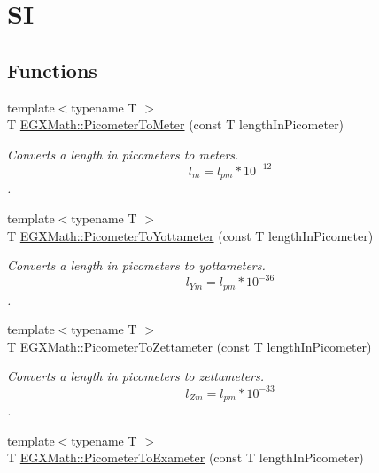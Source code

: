 \hypertarget{group___e_g_x_math-_conversions-_length_conversions-_s_i-_picometer-_s_i}{}\section{SI}
\label{group___e_g_x_math-_conversions-_length_conversions-_s_i-_picometer-_s_i}
\subsection*{Functions}
\begin{DoxyCompactItemize}
\item 
{\footnotesize template$<$typename T $>$ }\\T \mbox{\hyperlink{group___e_g_x_math-_conversions-_length_conversions-_s_i-_picometer-_s_i_gab975f2eb902fcbb745ee4edbbf611f69}{E\+G\+X\+Math\+::\+Picometer\+To\+Meter}} (const T length\+In\+Picometer)
\begin{DoxyCompactList}\small\item\em Converts a length in picometers to meters. \[ l_{m}=l_{pm} * 10^{-12} \]. \end{DoxyCompactList}\item 
{\footnotesize template$<$typename T $>$ }\\T \mbox{\hyperlink{group___e_g_x_math-_conversions-_length_conversions-_s_i-_picometer-_s_i_ga02d71cee34c4570a0c17529eb481a26f}{E\+G\+X\+Math\+::\+Picometer\+To\+Yottameter}} (const T length\+In\+Picometer)
\begin{DoxyCompactList}\small\item\em Converts a length in picometers to yottameters. \[ l_{Ym}=l_{pm} * 10^{-36} \]. \end{DoxyCompactList}\item 
{\footnotesize template$<$typename T $>$ }\\T \mbox{\hyperlink{group___e_g_x_math-_conversions-_length_conversions-_s_i-_picometer-_s_i_gae3d104d5bddc3f76d951fb0c86aa31ca}{E\+G\+X\+Math\+::\+Picometer\+To\+Zettameter}} (const T length\+In\+Picometer)
\begin{DoxyCompactList}\small\item\em Converts a length in picometers to zettameters. \[ l_{Zm}=l_{pm} * 10^{-33} \]. \end{DoxyCompactList}\item 
{\footnotesize template$<$typename T $>$ }\\T \mbox{\hyperlink{group___e_g_x_math-_conversions-_length_conversions-_s_i-_picometer-_s_i_gaa62371decac9806280c05abaffc3b460}{E\+G\+X\+Math\+::\+Picometer\+To\+Exameter}} (const T length\+In\+Picometer)

\end{DoxyCompactItemize}
